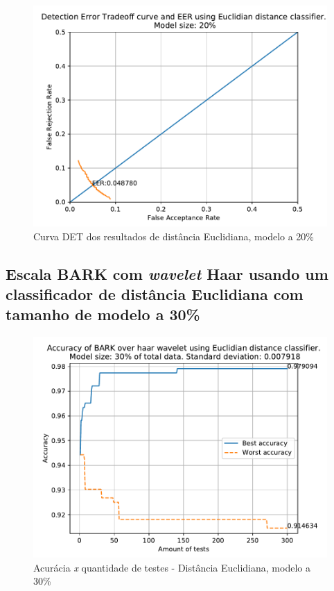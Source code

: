 			\begin{figure}[!ht]
				\centering
				\includegraphics[width=.6\linewidth]{images/results/det/DET_for_classifier_Euclidian_20}
				\caption{Curva DET dos resultados de distância Euclidiana, modelo a 20\%}
				\label{fig:detforclassifiereuclidian20}
			\end{figure}

			\FloatBarrier
		\subsection{Escala BARK com \textit{wavelet} Haar usando um classificador de distância Euclidiana com tamanho de modelo a 30\%}
		
			
		
			\begin{figure}[ht]
				\centering
				\includegraphics[width=.6\linewidth]{images/results/confusionMatrices/classifier_Euclidian_30}
				\caption{Acurácia \textit{x} quantidade de testes - Distância Euclidiana, modelo a 30\%}
				\label{fig:classifiereuclidian30}
			\end{figure}
		
